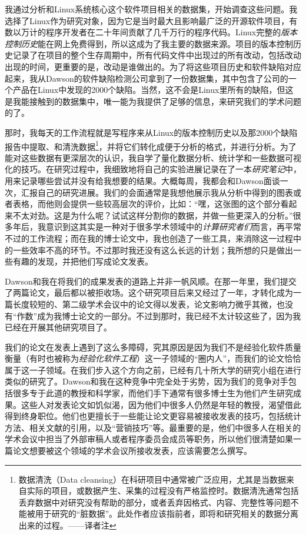 \documentclass[letter,12pt]{book}
\begin{document}
\begin{CJK}{UTF8}{gbsn}
我通过分析和Linux系统核心这个软件项目相关的数据集，开始调查这些问题。我选择了Linux作为研究对象，因为它是当时最大且影响最广泛的开源软件项目，有数以万计的程序开发者在二十年间贡献了几千万行的程序代码。Linux完整的\emph{版本控制历史}能在网上免费得到，所以这成为了我主要的数据来源。项目的版本控制历史记录了在项目的整个生存周期中，所有代码文件中出现过的所有改动，包括改动出现的时间，更重要的是，改动是谁做出的。为了将这些项目历史和软件缺陷对应起来，我从Dawson的软件缺陷检测公司拿到了一份数据集，其中包含了公司的一个产品在Linux中发现的2000个缺陷。当然，这不会是Linux里所有的缺陷，但这是我能接触到的数据集中，唯一能为我提供了足够的信息，来研究我们的学术问题的了。

那时，我每天的工作流程就是写程序来从Linux的版本控制历史以及那2000个缺陷报告中提取、和清洗数据\footnote{数据清洗（Data cleansing）在科研项目中通常被广泛应用，尤其是当数据来自实际的项目，或数据产生、采集的过程没有严格监控时。数据清洗通常包括丢弃数据中对研究没有帮助的部分，或者丢弃因格式、内容、完整性等问题不能被用于研究的“脏数据”。此处作者应该指前者，即将和研究相关的数据分离出来的过程。——译者注}，并将它们转化成便于分析的格式，并进行分析。为了能对这些数据有更深层次的认识，我自学了量化数据分析、统计学和一些数据可视化的技巧。在研究过程中，我细致地将自己的实验进展记录在了一本\emph{研究笔记}中，用来记录哪些尝试并没有给我想要的结果。大概每周，我都会和Dawson面谈一次，汇报自己的研究进展。我们的会面通常是我想他展示我从分析中得到的图表或者表格，而他则会提供一些较高层次的评价，比如：“嘿，这张图的这个部分看起来不太对劲。这是为什么呢？试试这样分割你的数据，并做一些更深入的分析。”很多年后，我意识到这其实是一种对于很多学术领域中的\emph{计算研究者们}而言，再平常不过的工作流程；而在我的博士论文中，我也创造了一些工具，来消除这一过程中的一些效率不高的环节。不过那时我还没有这么长远的计划；我所想的只是做出一些有趣的发现，并把他们写成论文发表。

\breakline

Dawson和我在将我们的成果发表的道路上并非一帆风顺。在那一年里，我们提交了两篇论文，最后都以被拒收场。这个研究项目后来又经过了一年，才转化成为一篇长度较短的、第二级学术会议中的论文得以发表，论文影响力微乎其微，也没有“作数”成为我博士论文的一部分。不过到那时，我已经不太计较这些了，因为我已经在开展其他研究项目了。

我们的论文在发表上遇到了这么多障碍，究其原因是因为我们不是经验化软件质量衡量（有时也被称为\emph{经验化软件工程}）这一子领域的“圈内人”，而我们的论文恰恰属于这一子领域。在我们步入这个方向之前，已经有几十所大学的研究小组在进行类似的研究了。Dawson和我在这种竞争中完全处于劣势，因为我们的竞争对手包括很多专于此道的教授和科学家，而他们手下通常有很多博士生为他们产生研究成果。这些人对发表论文如饥似渴，因为他们中很多人仍然是年轻的教授，渴望借此得到终身职位。他们也更擅长于一些能让论文更容易被接收发表的技巧，包括统计方法、相关文献的引用，以及“营销技巧”等。最重要的是，他们中很多人在相关的学术会议中担当了外部审稿人或者程序委员会成员等职务，所以他们很清楚如果一篇论文想要被这个领域的学术会议所接收发表，应该需要怎么撰写。


\end{CJK}
\end{document}

